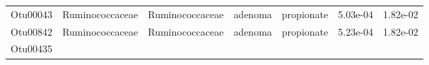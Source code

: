 \documentclass[11pt,]{article}
\begin{document}
\begin{longtable}[]{@{}ccccccc@{}}
\begin{minipage}[t]{0.09\columnwidth}\centering\strut
Otu00043\strut
\end{minipage} & \begin{minipage}[t]{0.17\columnwidth}\centering\strut
Ruminococcaceae\strut
\end{minipage} & \begin{minipage}[t]{0.17\columnwidth}\centering\strut
Ruminococcaceae\strut
\end{minipage} & \begin{minipage}[t]{0.09\columnwidth}\centering\strut
adenoma\strut
\end{minipage} & \begin{minipage}[t]{0.11\columnwidth}\centering\strut
propionate\strut
\end{minipage} & \begin{minipage}[t]{0.09\columnwidth}\centering\strut
5.03e-04\strut
\end{minipage} & \begin{minipage}[t]{0.09\columnwidth}\centering\strut
1.82e-02\strut
\end{minipage}\tabularnewline
\begin{minipage}[t]{0.09\columnwidth}\centering\strut
Otu00842\strut
\end{minipage} & \begin{minipage}[t]{0.17\columnwidth}\centering\strut
Ruminococcaceae\strut
\end{minipage} & \begin{minipage}[t]{0.17\columnwidth}\centering\strut
Ruminococcaceae\strut
\end{minipage} & \begin{minipage}[t]{0.09\columnwidth}\centering\strut
adenoma\strut
\end{minipage} & \begin{minipage}[t]{0.11\columnwidth}\centering\strut
propionate\strut
\end{minipage} & \begin{minipage}[t]{0.09\columnwidth}\centering\strut
5.23e-04\strut
\end{minipage} & \begin{minipage}[t]{0.09\columnwidth}\centering\strut
1.82e-02\strut
\end{minipage}\tabularnewline
\begin{minipage}[t]{0.09\columnwidth}\centering\strut
Otu00435\strut
\end{minipage} & \begin{minipage}[t]{0.17\columnwidth}\centering\strut

\end{minipage}
\end{longtable}
\end{document}
